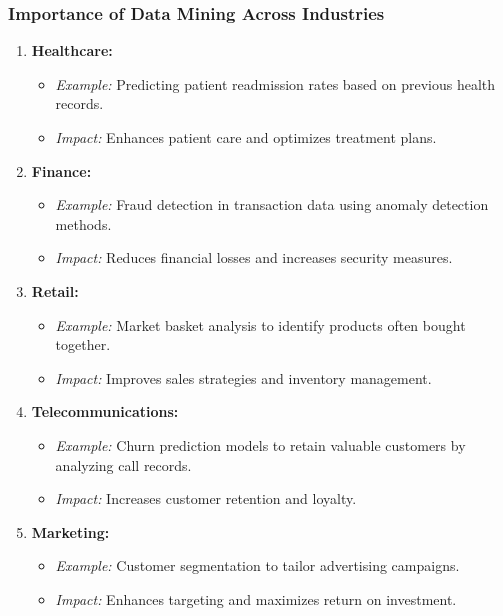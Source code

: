 \documentclass[aspectratio=169]{beamer}
\begin{document}
\begin{frame}[fragile]
    \frametitle{Importance of Data Mining Across Industries}
    \begin{enumerate}
        \item \textbf{Healthcare:}
            \begin{itemize}
                \item \textit{Example:} Predicting patient readmission rates based on previous health records.
                \item \textit{Impact:} Enhances patient care and optimizes treatment plans.
            \end{itemize}

        \item \textbf{Finance:}
            \begin{itemize}
                \item \textit{Example:} Fraud detection in transaction data using anomaly detection methods.
                \item \textit{Impact:} Reduces financial losses and increases security measures.
            \end{itemize}

        \item \textbf{Retail:}
            \begin{itemize}
                \item \textit{Example:} Market basket analysis to identify products often bought together.
                \item \textit{Impact:} Improves sales strategies and inventory management.
            \end{itemize}

        \item \textbf{Telecommunications:}
            \begin{itemize}
                \item \textit{Example:} Churn prediction models to retain valuable customers by analyzing call records.
                \item \textit{Impact:} Increases customer retention and loyalty.
            \end{itemize}

        \item \textbf{Marketing:}
            \begin{itemize}
                \item \textit{Example:} Customer segmentation to tailor advertising campaigns.
                \item \textit{Impact:} Enhances targeting and maximizes return on investment.
            \end{itemize}
    \end{enumerate}
\end{frame}
\end{document}
